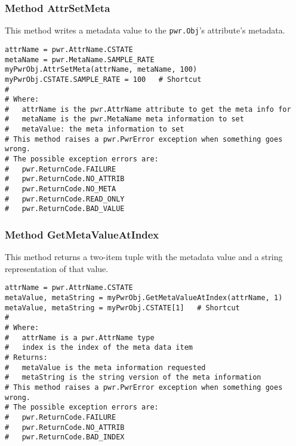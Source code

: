 \subsubsection{Method AttrSetMeta} \label{meth:AttrSetMeta}

This method writes a metadata value to the \texttt{pwr.Obj}'s attribute's metadata.
\begin{center}\begin{minipage}{.95\linewidth}\begin{lstlisting}
attrName = pwr.AttrName.CSTATE
metaName = pwr.MetaName.SAMPLE_RATE
myPwrObj.AttrSetMeta(attrName, metaName, 100)
myPwrObj.CSTATE.SAMPLE_RATE = 100   # Shortcut
#
# Where:
#   attrName is the pwr.AttrName attribute to get the meta info for
#   metaName is the pwr.MetaName meta information to set
#   metaValue: the meta information to set
# This method raises a pwr.PwrError exception when something goes wrong.
# The possible exception errors are:
#   pwr.ReturnCode.FAILURE
#   pwr.ReturnCode.NO_ATTRIB
#   pwr.ReturnCode.NO_META
#   pwr.ReturnCode.READ_ONLY
#   pwr.ReturnCode.BAD_VALUE
\end{lstlisting}\end{minipage}\end{center}

\subsubsection{Method GetMetaValueAtIndex} \label{meth:GetMetaValueAtIndex}

This method returns a two-item tuple with the metadata value and a string representation of that value.
\begin{center}\begin{minipage}{.95\linewidth}\begin{lstlisting}
attrName = pwr.AttrName.CSTATE
metaValue, metaString = myPwrObj.GetMetaValueAtIndex(attrName, 1)
metaValue, metaString = myPwrObj.CSTATE[1]   # Shortcut
#
# Where:
#   attrName is a pwr.AttrName type
#   index is the index of the meta data item
# Returns:
#   metaValue is the meta information requested
#   metaString is the string version of the meta information
# This method raises a pwr.PwrError exception when something goes wrong.
# The possible exception errors are:
#   pwr.ReturnCode.FAILURE
#   pwr.ReturnCode.NO_ATTRIB
#   pwr.ReturnCode.BAD_INDEX
\end{lstlisting}\end{minipage}\end{center}

